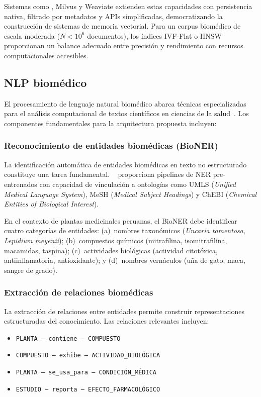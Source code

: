 Sistemas como \chromadb{}, Milvus y Weaviate extienden estas capacidades con persistencia nativa, filtrado por metadatos y APIs simplificadas, democratizando la construcción de sistemas de memoria vectorial. Para un corpus biomédico de escala moderada ($N < 10^6$ documentos), los índices IVF-Flat o HNSW proporcionan un balance adecuado entre precisión y rendimiento con recursos computacionales accesibles.

\subsection{NLP biomédico}
\label{subsec:tf_bionlp}

El procesamiento de lenguaje natural biomédico abarca técnicas especializadas para el análisis computacional de textos científicos en ciencias de la salud~\cite{lee2020biobert}. Los componentes fundamentales para la arquitectura propuesta incluyen:

\subsubsection{Reconocimiento de entidades biomédicas (BioNER)}

La identificación automática de entidades biomédicas en texto no estructurado constituye una tarea fundamental. \scispacy{}~\cite{neumann2019scispacy} proporciona pipelines de NER pre-entrenados con capacidad de vinculación a ontologías como UMLS (\textit{Unified Medical Language System}), MeSH (\textit{Medical Subject Headings}) y ChEBI (\textit{Chemical Entities of Biological Interest}).

En el contexto de plantas medicinales peruanas, el BioNER debe identificar cuatro categorías de entidades: (a)~nombres taxonómicos (\textit{Uncaria tomentosa}, \textit{Lepidium meyenii}); (b)~compuestos químicos (mitrafilina, isomitrafilina, macamidas, taspina); (c)~actividades biológicas (actividad citotóxica, antiinflamatoria, antioxidante); y (d)~nombres vernáculos (uña de gato, maca, sangre de grado).

\subsubsection{Extracción de relaciones biomédicas}

La extracción de relaciones entre entidades permite construir representaciones estructuradas del conocimiento. Las relaciones relevantes incluyen:
\begin{itemize}[leftmargin=*]
  \item \texttt{PLANTA -- contiene -- COMPUESTO}
  \item \texttt{COMPUESTO -- exhibe -- ACTIVIDAD\_BIOLÓGICA}
  \item \texttt{PLANTA -- se\_usa\_para -- CONDICIÓN\_MÉDICA}
  \item \texttt{ESTUDIO -- reporta -- EFECTO\_FARMACOLÓGICO}
\end{itemize}

